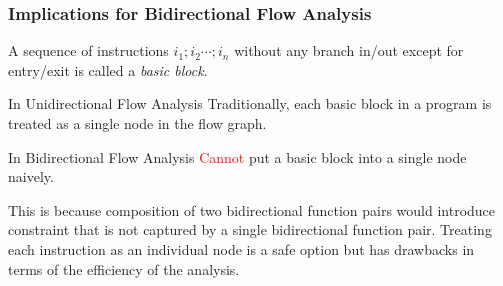\documentclass{beamer}
\newcommand{\Pow}{\mathcal{P}}
\newcommand{\tomon}{\to_{\mathrm{mon}}}
\newcommand{\red}[1]{\textcolor{red}{#1}}
\begin{document}
\begin{frame}
  \frametitle{Implications for Bidirectional Flow Analysis}
  A sequence of instructions $i_{1};i_{2}\cdots;i_{n}$ without any branch in/out except for entry/exit is called a \emph{basic block}.
  \begin{block}{In Unidirectional Flow Analysis}
    Traditionally, each basic block in a program is treated as a single node in the flow graph.
  \end{block}
  \begin{block}{In Bidirectional Flow Analysis}
    \red{Cannot} put a basic block into a single node naively.
  \end{block}
  This is because composition of two bidirectional function pairs would introduce constraint that is not captured by a single bidirectional function pair. Treating each instruction as an individual node is a safe option but has drawbacks in terms of the efficiency of the analysis.
\end{frame}



%
\end{document}
